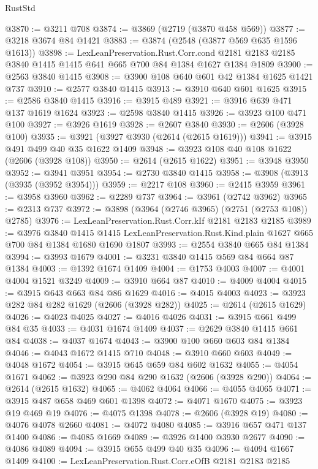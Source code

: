 \begin{lexlean}{RustStd}
\begin{coremodule}
@3870 := @3211 @708
@3874 := @3869 (@2719 (@3870 @458 @569))
@3877 := @3218 @3674 @84 @1421
@3883 := @3874 (@2548 (@3877 @569 @635 @1596 @1613))
@3898 := LexLeanPreservation.Rust.Corr.cond
    @2181
    @2183
    @2185
    @3840
    @1415
    @1415
    @641
    @665
    @700
    @84
    @1384
    @1627
    @1384
    @1809
@3900 := @2563 @3840 @1415
@3908 := @3900 @108 @640 @601 @42 @1384 @1625 @1421 @737
@3910 := @2577 @3840 @1415
@3913 := @3910 @640 @601 @1625
@3915 := @2586 @3840 @1415
@3916 := @3915 @489
@3921 := @3916 @639 @471 @137 @1619 @1624
@3923 := @2598 @3840 @1415
@3926 := @3923 @100 @471 @100
@3927 := @3926 @1619
@3928 := @2607 @3840
@3930 := @2606 (@3928 @100)
@3935 := @3921 (@3927 @3930 (@2614 (@2615 @1619)))
@3941 := @3915 @491 @499 @40 @35 @1622 @1409
@3948 := @3923 @108 @40 @108 @1622 (@2606 (@3928 @108))
@3950 := @2614 (@2615 @1622)
@3951 := @3948 @3950
@3952 := @3941 @3951
@3954 := @2730 @3840 @1415
@3958 := @3908 (@3913 (@3935 (@3952 @3954)))
@3959 := @2217 @108
@3960 := @2415 @3959
@3961 := @3958 @3960
@3962 := @2289 @737
@3964 := @3961 (@2742 @3962)
@3965 := @2313 @737
@3972 := @3898 (@3964 (@2746 @3965) (@2751 (@2753 @108)) @2785)
@3976 := LexLeanPreservation.Rust.Corr.kIf @2181 @2183 @2185
@3989 := @3976
    @3840
    @1415
    @1415
    LexLeanPreservation.Rust.Kind.plain
    @1627
    @665
    @700
    @84
    @1384
    @1680
    @1690
    @1807
@3993 := @2554 @3840 @665 @84 @1384
@3994 := @3993 @1679
@4001 := @3231 @3840 @1415 @569 @84 @664 @87 @1384
@4003 := @1392 @1674 @1409
@4004 := @1753 @4003
@4007 := @4001 @4004 @1521 @3249
@4009 := @3910 @664 @87
@4010 := @4009 @4004
@4015 := @3915 @643 @663 @84 @86 @1629
@4016 := @4015 @4003
@4023 := @3923 @282 @84 @282 @1629 (@2606 (@3928 @282))
@4025 := @2614 (@2615 @1629)
@4026 := @4023 @4025
@4027 := @4016 @4026
@4031 := @3915 @661 @499 @84 @35
@4033 := @4031 @1674 @1409
@4037 := @2629 @3840 @1415 @661 @84
@4038 := @4037 @1674
@4043 := @3900 @100 @660 @603 @84 @1384
@4046 := @4043 @1672 @1415 @710
@4048 := @3910 @660 @603
@4049 := @4048 @1672
@4054 := @3915 @645 @659 @84 @602 @1632
@4055 := @4054 @1671
@4062 := @3923 @290 @84 @290 @1632 (@2606 (@3928 @290))
@4064 := @2614 (@2615 @1632)
@4065 := @4062 @4064
@4066 := @4055 @4065
@4071 := @3915 @487 @658 @469 @601 @1398
@4072 := @4071 @1670
@4075 := @3923 @19 @469 @19
@4076 := @4075 @1398
@4078 := @2606 (@3928 @19)
@4080 := @4076 @4078 @2660
@4081 := @4072 @4080
@4085 := @3916 @657 @471 @137 @1400
@4086 := @4085 @1669
@4089 := @3926 @1400 @3930 @2677
@4090 := @4086 @4089
@4094 := @3915 @655 @499 @40 @35
@4096 := @4094 @1667 @1409
@4100 := LexLeanPreservation.Rust.Corr.eOfB @2181 @2183 @2185

\end{coremodule}
\end{lexlean}
